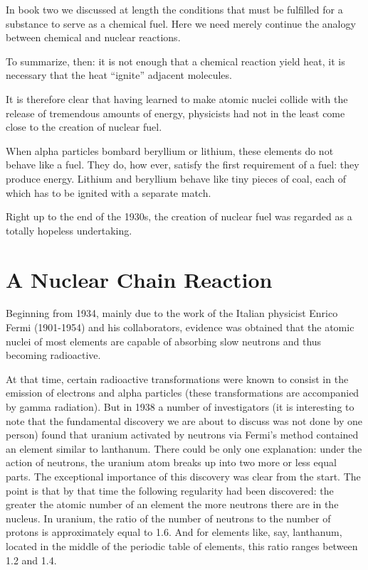 In book two we discussed at length the conditions that must be fulfilled for a substance to serve as a chemical fuel. Here we need merely continue the analogy between chemical and nuclear reactions.

To summarize, then: it is not enough that a chemical reaction yield heat, it is necessary that the heat ``ignite'' adjacent molecules.

It is therefore clear that having learned to make atomic nuclei collide with the release of tremendous amounts of energy, physicists had not in the least come close to the creation of nuclear fuel.

When alpha particles bombard beryllium or lithium, these elements do not behave like a fuel. They do, how­ ever, satisfy the first requirement of a fuel: they produce energy. Lithium and beryllium behave like tiny pieces of coal, each of which has to be ignited with a separate match.

Right up to the end of the 1930s, the creation of nuclear fuel was regarded as a totally hopeless undertaking.

\section{A Nuclear Chain Reaction}

Beginning from 1934, mainly due to the work of the Italian physicist Enrico Fermi (1901-1954) and his col­laborators, evidence was obtained that the atomic nuclei of most elements are capable of absorbing slow neutrons and thus becoming radioactive.

At that time, certain radioactive transformations were known to consist in the emission of electrons and alpha particles (these transformations are accompanied by gamma radiation). But in 1938 a number of investigators (it is interesting to note that the fundamental discovery we are about to discuss was not done by one person) found that uranium activated by neutrons via Fermi’s method contained an element similar to lanthanum. There could be only one explanation: under the action of neutrons, the uranium atom breaks up into two more or less equal parts. The exceptional importance of this discovery was clear from the start. The point is that by that time the following regularity had been discovered: the greater the atomic number of an element the more neutrons there are in the nucleus. In uranium, the ratio of the number of neutrons to the number of protons is approximately equal to 1.6. And for elements like, say, lanthanum, located in the middle of the periodic table of elements, this ratio ranges between 1.2 and 1.4.



